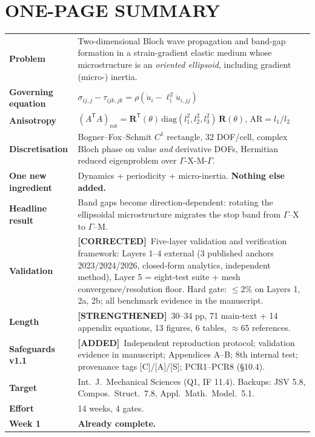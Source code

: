 \documentclass[11pt,a4paper]{article}
\newcommand{\ADDED}{{\color{addcol}\textbf{[ADDED]}}}
\newcommand{\STR}{{\color{strcol}\textbf{[STRENGTHENED]}}}
\newcommand{\COR}{{\color{corcol}\textbf{[CORRECTED]}}}
\begin{document}
\section*{\color{lockblue}ONE-PAGE SUMMARY}

\begin{xltabular}{\textwidth}{@{}L{3.3cm} Y@{}}
\textbf{Problem} & Two-dimensional Bloch wave propagation and band-gap formation in a strain-gradient elastic medium whose microstructure is an \emph{oriented ellipsoid}, including gradient (micro-) inertia. \\
\textbf{Governing equation} & $\sigma_{ij,j}-\tau_{ijk,jk}=\rho\left(\ddot u_i-\ell_{\mathrm i}^2\ddot u_{i,jj}\right)$ \\
\textbf{Anisotropy} & $(A^{\mathsf T}\!A)_{\mathrm{rot}}=\bm R^{\mathsf T}(\theta)\,\mathrm{diag}(l_1^2,l_2^2,l_3^2)\,\bm R(\theta)$, \quad $\mathrm{AR}=l_1/l_2$ \\
\textbf{Discretisation} & Bogner--Fox--Schmit $C^1$ rectangle, 32 DOF/cell, complex Bloch phase on value \emph{and} derivative DOFs, Hermitian reduced eigenproblem over $\Gamma$-X-M-$\Gamma$. \\
\textbf{One new ingredient} & Dynamics + periodicity + micro-inertia. \textbf{Nothing else added.} \\
\textbf{Headline result} & Band gaps become direction-dependent: rotating the ellipsoidal microstructure migrates the stop band from $\Gamma$--X to $\Gamma$--M. \\
\textbf{Validation} & \COR\ Five-layer validation and verification framework: Layers 1--4 external (3 published anchors 2023/2024/2026, closed-form analytics, independent method), Layer 5 = eight-test suite + mesh convergence/resolution floor. Hard gate: $\le2\%$ on Layers 1, 2a, 2b; all benchmark evidence in the manuscript. \\
\textbf{Length} & \STR\ 30--34 pp, 71 main-text + 14 appendix equations, 13 figures, 6 tables, $\approx$65 references. \\
\textbf{Safeguards v1.1} & \ADDED\ Independent reproduction protocol; validation evidence in manuscript; Appendices A--B; 8th internal test; provenance tags [C]/[A]/[S]; PCR1--PCR8 (\S10.4). \\
\textbf{Target} & Int.\ J.\ Mechanical Sciences (Q1, IF 11.4). Backups: JSV 5.8, Compos.\ Struct.\ 7.8, Appl.\ Math.\ Model.\ 5.1. \\
\textbf{Effort} & 14 weeks, 4 gates. \\
\textbf{Week 1} & \textcolor{ok}{\textbf{Already complete.}} \\
\end{xltabular}
\end{document}
